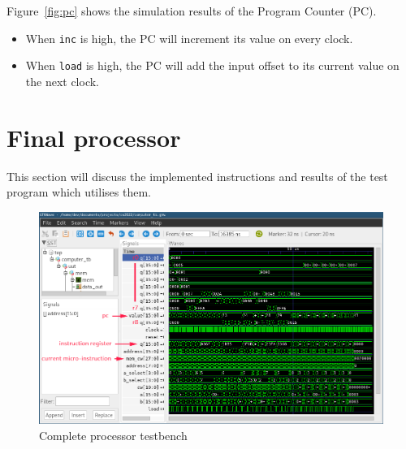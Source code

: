\documentclass[a4paper]{article}
\numberwithin{figure}{section}
\numberwithin{table}{section}
\newcommand{\mi}{\mintinline}
\begin{document}
Figure~\ref{fig:pc} shows the simulation results of the Program Counter (PC).
\begin{itemize}
	\item When \mi{c}{inc} is high, the PC will increment its value on every clock.
	\item When \mi{c}{load} is high, the PC will add the input offset to its current value on the next clock.
\end{itemize}

\newpage
\section{Final processor}
This section will discuss the implemented instructions and results of the test program which utilises them.
\begin{figure}[h!]
	\centering
	\includegraphics[width=\textwidth]{computer_overview}
	\caption{Complete processor testbench}
	\label{fig:coverview}
\end{figure}

\newpage
\end{document}
